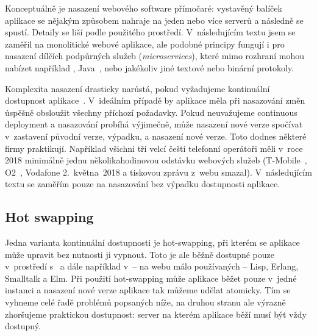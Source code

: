         Konceptuálně je nasazení webového software přímočaré: vystavěný balíček aplikace se nějakým způsobem nahraje na jeden nebo více serverů a následně se spustí. Detaily se liší podle použitého prostředí. V~následujícím textu jsem se zaměřil na monolitické webové aplikace, ale podobné principy fungují i pro nasazení dílčích podpůrných služeb (\textit{microservices}), které mimo \HTTP rozhraní mohou nabízet například , Java~, nebo jakékoliv jiné textové nebo binární protokoly.

        Komplexita nasazení drasticky narůstá, pokud vyžadujeme kontinuální dostupnost aplikace~\cite{beyer2016site}. V~ideálním případě by aplikace měla při nasazování změn úspěšně obsloužit všechny příchozí požadavky. Pokud neuvažujeme continuous deployment a nasazování probíhá výjimečně, může nasazení nové verze spočívat v~zastavení původní verze, výpadku, a nasazení nové verze. Toto dodnes některé firmy praktikují. Například všichni tři velcí čeští telefonní operátoři měli v~roce 2018 minimálně jednu několikahodinovou odstávku webových služeb (T-Mobile~\cite{tmobile-odstavka}, O2~\cite{o2-odstavka}, Vodafone 2.~května~2018 a tiskovou zprávu z~webu smazal). V~následujícím textu se zaměřím pouze na nasazování bez výpadku dostupnosti aplikace.

        \subsection{Hot swapping}
            Jedna varianta kontinuální dostupnosti je hot-swapping, při kterém se aplikace může upravit bez nutnosti ji vypnout. Toto je ale běžně dostupné pouze v~prostředí s~ a dále například v~-- na webu málo používaných -- Lisp, Erlang, Smalltalk a Elm. Při použití hot-swapping může aplikace běžet pouze v~jedné instanci a nasazení nové verze aplikace tak můžeme udělat atomicky. Tím se vyhneme celé řadě problémů popsaných níže, na druhou stranu ale výrazně zhoršujeme praktickou dostupnost: server na kterém aplikace běží musí být vždy dostupný.

